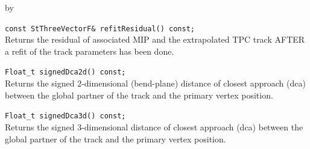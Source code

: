 \documentclass[twoside]{article}
\newcommand{\entrylabel}[1]{\mbox{\textbf{{#1}}}\hfil}%
\newenvironment{entry}
{\begin{list}{}%
    {\renewcommand{\makelabel}{\entrylabel}%
     \setlength{\labelwidth}{90pt}%
     \setlength{\leftmargin}{\labelwidth}
     \advance\leftmargin by \labelsep%
      }%
    }%
  {\end{list}}
\newcommand{\Entrylabel}[1]%
{\raisebox{0pt}[1ex][0pt]{\makebox[\labelwidth][l]%
    {\parbox[t]{\labelwidth}{\hspace{0pt}\textbf{{#1}}}}}}
\newenvironment{Entry}%
{\renewcommand{\entrylabel}{\Entrylabel}\begin{entry}}%
  {\end{entry}}
\begin{document}
\begin{Entry}
    \verb+const StThreeVectorF& refitResidual() const;+\\
    Returns the residual of associated MIP and the
    extrapolated TPC track AFTER a refit of the track
    parameters has been done.

    \verb+Float_t signedDca2d() const;+\\
    Returns the signed 2-dimensional (bend-plane)
    distance of closest approach (dca) between the
    global partner of the track and the primary vertex
    position.
    
    \verb+Float_t signedDca3d() const;+\\
    Returns the signed 3-dimensional
    distance of closest approach (dca) between the
    global partner of the track and the primary vertex
    position.
\end{Entry}
\clearpage
\end{document}
